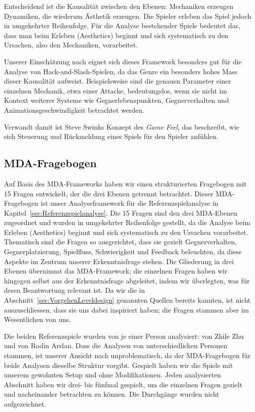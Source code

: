 \documentclass[../Main.tex]{subfiles}
\begin{document}
Entscheidend ist die Kausalität zwischen den Ebenen: Mechaniken erzeugen Dynamiken, die wiederum Ästhetik erzeugen. Die Spieler erleben das Spiel jedoch in umgekehrter Reihenfolge.\autocite[\textcolor{red}{S.~??}]{hunicke2004mda} Für die Analyse bestehender Spiele bedeutet das, dass man beim Erleben (Aesthetics) beginnt und sich systematisch zu den Ursachen, also den Mechaniken, vorarbeitet.

Unserer Einschätzung nach eignet sich dieses Framework besonders gut für die Analyse von Hack-and-Slash-Spielen, da das Genre ein besonders hohes Mass dieser Kausalität aufweist. Beispielsweise sind die genauen Parameter einer einzelnen Mechanik, etwa einer Attacke, bedeutungslos, wenn sie nicht im Kontext weiterer Systeme wie Gegnerlebenspunkten, Gegnerverhalten und Animationsgeschwindigkeit betrachtet werden.

Verwandt damit ist Steve Swinks Konzept des \textit{Game Feel}, das beschreibt, wie sich Steuerung und Rückmeldung eines Spiels für den Spieler anfühlen.\autocite[1--6]{swink2008gamefeel}

\subsection{MDA-Fragebogen} \label{sec:Analysefragebogen}

Auf Basis des MDA-Frameworks haben wir einen strukturierten Fragebogen mit 15 Fragen entwickelt, der die drei Ebenen getrennt betrachtet. Dieser MDA-Fragebogen ist unser Analyseframework für die Referenzspielanalyse in Kapitel~\ref{sec:Referenzspielanalyse}. Die 15 Fragen sind den drei MDA-Ebenen zugeordnet und wurden in umgekehrter Reihenfolge gestellt, da die Analyse beim Erleben (Aesthetics) beginnt und sich systematisch zu den Ursachen vorarbeitet. Thematisch sind die Fragen so ausgerichtet, dass sie gezielt Gegnerverhalten, Gegnerplatzierung, Spielfluss, Schwierigkeit und Feedback beleuchten, da diese Aspekte im Zentrum unserer Erkenntnisfrage stehen. Die Gliederung in drei Ebenen übernimmt das MDA-Framework;\autocite{hunicke2004mda} die einzelnen Fragen haben wir hingegen selbst aus der Erkenntnisfrage abgeleitet, indem wir überlegten, was für deren Beantwortung relevant ist. Da wir die in Abschnitt~\ref{sec:VorgehenLeveldesign} genannten Quellen bereits kannten, ist nicht auszuschliessen, dass sie uns dabei inspiriert haben; die Fragen stammen aber im Wesentlichen von uns.

Die beiden Referenzspiele wurden von je einer Person analysiert:  von Zhile Zhu und  von Rodin Arslan. Dass die Analysen von unterschiedlichen Personen stammen, ist unserer Ansicht nach unproblematisch, da der MDA-Fragebogen für beide Analysen dieselbe Struktur vorgibt. Gespielt haben wir die Spiele mit unserem gewohnten Setup und ohne Modifikationen. Jeden analysierten Abschnitt haben wir drei- bis fünfmal gespielt, um die einzelnen Fragen gezielt und nacheinander betrachten zu können. Die Durchgänge wurden nicht aufgezeichnet.
\end{document}
